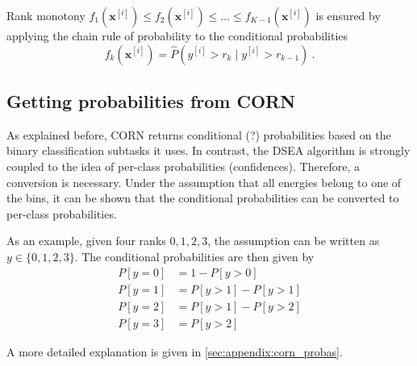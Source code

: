 Rank monotony
  $f_1(\mathbf{x}^{[i]}) \leq f_2(\mathbf{x}^{[i]}) \leq \ldots \leq f_{K-1}(\mathbf{x}^{[i]})$
is ensured by
applying the chain rule of probability
to the conditional probabilities
\begin{equation}
  f_k(\mathbf{x}^{[i]}) = \hat{P}\left( y^{[i]} > r_k \mid y^{[i]} > r_{k-1} \right) \ .
\end{equation}





\subsection{Getting probabilities from CORN} %
As explained before,
CORN returns conditional (?) probabilities based on the binary classification subtasks it uses.
In contrast,
the DSEA algorithm is strongly coupled to the idea of per-class probabilities (confidences).
Therefore, a conversion is necessary.
Under the assumption that all energies belong to one of the bins,
it can be shown that the conditional probabilities can be converted to per-class probabilities.

As an example, given four ranks $0, 1, 2, 3$,
the assumption can be written as $y \in \{0, 1, 2, 3\}$.
The conditional probabilities are then given by
\begin{align*}
  P[y=0] &= 1 - P[y>0] \\
  P[y=1] &= P[y>1] - P[y>1] \\
  P[y=2] &= P[y>1] - P[y>2] \\
  P[y=3] &= P[y>2]
\end{align*}

A more detailed explanation is given in \autoref{sec:appendix:corn_probas}.
